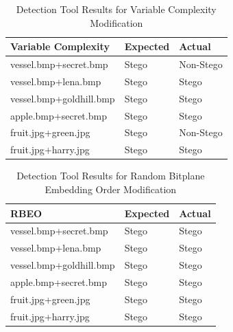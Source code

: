 \documentclass{l4proj}
\begin{document}
\begin{appendices}
\begin{table}[!h]
\centering
\caption{Detection Tool Results for Variable Complexity Modification}
\label{table:detection_results_variable}
\begin{tabular}{@{}lll@{}}
\toprule
Variable Complexity     & Expected & Actual                \\\midrule
vessel.bmp+secret.bmp   & Stego    & Non-Stego             \\
vessel.bmp+lena.bmp     & Stego    & Stego                 \\
vessel.bmp+goldhill.bmp & Stego    & Stego                 \\
apple.bmp+secret.bmp    & Stego    & Stego                 \\
fruit.jpg+green.jpg     & Stego    & Non-Stego             \\
fruit.jpg+harry.jpg     & Stego    & Stego                \\\bottomrule
\end{tabular}
\end{table}

\begin{table}[!h]
\centering
\caption{Detection Tool Results for Random Bitplane Embedding Order Modification}
\label{table:detection_results_rbeo}
\begin{tabular}{@{}lll@{}}
\toprule
RBEO                    & Expected & Actual \\\midrule
vessel.bmp+secret.bmp   & Stego    & Stego  \\
vessel.bmp+lena.bmp     & Stego    & Stego  \\
vessel.bmp+goldhill.bmp & Stego    & Stego  \\
apple.bmp+secret.bmp    & Stego    & Stego  \\
fruit.jpg+green.jpg     & Stego    & Stego  \\
fruit.jpg+harry.jpg     & Stego    & Stego  \\\bottomrule
\end{tabular}
\end{table}


\end{appendices}
\end{document}
